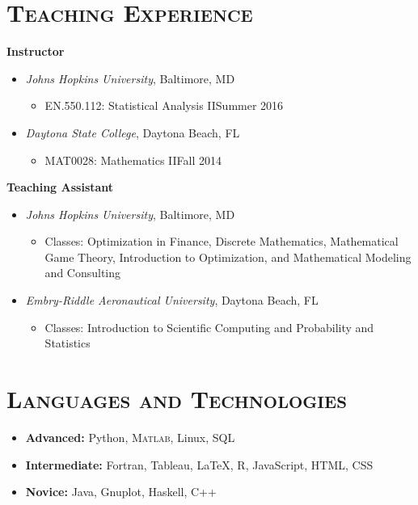 \documentclass[10pt]{article}
\begin{document}
\section*{\textsc{Teaching Experience}}
\textbf{Instructor}
\begin{itemize}[noitemsep]
	\item[] \textit{Johns Hopkins University}, Baltimore, MD
	\begin{itemize}[noitemsep]
		\item EN.550.112: Statistical Analysis II\hfill Summer 2016
	\end{itemize}
	\vspace{1ex}
	\item[] \textit{Daytona State College}, Daytona Beach, FL
    \begin{itemize}[noitemsep]
        \item MAT0028: Mathematics II\hfill Fall 2014
    \end{itemize}
\end{itemize}
\textbf{Teaching Assistant}
\begin{itemize}[noitemsep]
    \item[] \textit{Johns Hopkins University}, Baltimore, MD
    \begin{itemize}[noitemsep]
    		\item[] Classes: Optimization in Finance, Discrete Mathematics, Mathematical Game Theory, Introduction to Optimization, and Mathematical Modeling and Consulting
    \end{itemize}
    \vspace{1ex}
    \item[] \textit{Embry-Riddle Aeronautical University}, Daytona Beach, FL
    \begin{itemize}[noitemsep]
        \item[] Classes: Introduction to Scientific Computing and Probability and Statistics
    \end{itemize}
\end{itemize}

\section*{\textsc{Languages and Technologies}}
\begin{itemize}
    \item[] \textbf{Advanced:} Python, \textsc{Matlab}, Linux, SQL
    \item[] \textbf{Intermediate:} Fortran, Tableau, \LaTeX{}, \textsc{R}, JavaScript, HTML, CSS
    \item[] \textbf{Novice:} Java, Gnuplot, Haskell, \textsc{C++}
\end{itemize}
\end{document}
